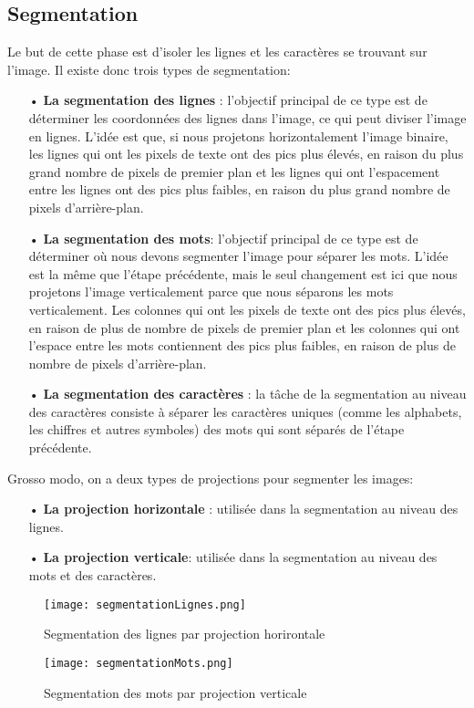     \subsection{Segmentation}
    Le but de cette phase est d'isoler les lignes et les  caractères se trouvant sur l'image. Il existe donc trois types de segmentation:
        \begin{itemize}
            \item[•]\textbf{La segmentation des lignes} : l'objectif principal de ce type est de déterminer les coordonnées des lignes dans l'image, ce qui peut diviser l'image en lignes. L’idée est que, si nous projetons horizontalement l'image binaire, les lignes qui ont les pixels de texte ont des pics plus élevés, en raison du plus grand nombre de pixels de premier plan et les lignes qui ont l'espacement entre les lignes ont des pics plus faibles, en raison du plus grand nombre de pixels d'arrière-plan. 
            \item[•]\textbf{La segmentation des mots}: l'objectif principal de ce type est de déterminer où nous devons segmenter l'image pour séparer les mots. L’idée est la même que l'étape précédente, mais le seul changement est ici que nous projetons l'image verticalement parce que nous séparons les mots verticalement. Les colonnes qui ont les pixels de texte ont des pics plus élevés, en raison de plus de nombre de pixels de premier plan et les colonnes qui ont l'espace entre les mots contiennent des pics plus faibles, en raison de plus de nombre de pixels d'arrière-plan.
            \item[•]\textbf{La segmentation des caractères} : la tâche de la segmentation au niveau des caractères consiste à séparer les caractères uniques (comme les alphabets, les chiffres et autres symboles) des mots qui sont séparés de l'étape précédente.
        \end{itemize}
    Grosso modo, on a deux types de projections pour segmenter les images:
        \begin{itemize}
            \item[•]\textbf{La projection horizontale} : utilisée dans la segmentation au niveau des lignes.
            \item[•]\textbf{La projection verticale}: utilisée dans la segmentation au niveau des mots et des caractères.
        \end{itemize}
    \begin{figure}
        \centering
        \texttt{[image: segmentationLignes.png]}
        \caption{Segmentation des lignes par projection horirontale}
    \end{figure}
    \begin{figure}
        \centering
        \texttt{[image: segmentationMots.png]}
        \caption{Segmentation des mots par projection verticale}
    \end{figure}
